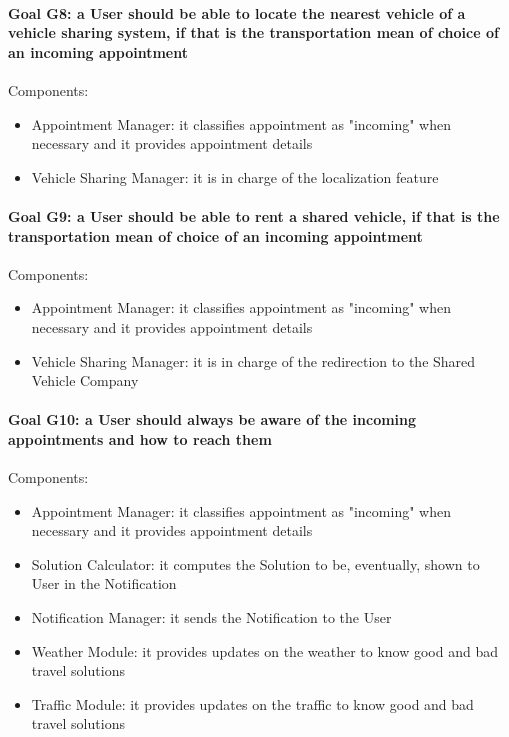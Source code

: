 \paragraph{Goal G8: a User should be able to locate the nearest vehicle of a vehicle sharing system, if that is the transportation mean of choice of an incoming appointment}
	Components:
	\begin{itemize}[label=--]
		\item Appointment Manager: it classifies appointment as "incoming" when necessary and it provides appointment details
		\item Vehicle Sharing Manager: it is in charge of the localization feature
	\end{itemize}

\paragraph{Goal G9: a User should be able to rent a shared vehicle, if that is the transportation mean of choice of an incoming appointment}
	Components:
	\begin{itemize}[label=--]
		\item Appointment Manager: it classifies appointment as "incoming" when necessary and it provides appointment details
		\item Vehicle Sharing Manager: it is in charge of the redirection to the Shared Vehicle Company
	\end{itemize}

\paragraph{Goal G10: a User should always be aware of the incoming appointments and how to reach them}
	Components:
	\begin{itemize}[label=--]
		\item Appointment Manager: it classifies appointment as "incoming" when necessary and it provides appointment details
		\item Solution Calculator: it computes the Solution to be, eventually, shown to User in the Notification
		\item Notification Manager: it sends the Notification to the User
		\item Weather Module: it provides updates on the weather to know good and bad travel solutions
		\item Traffic Module: it provides updates on the traffic to know good and bad travel solutions
	\end{itemize}